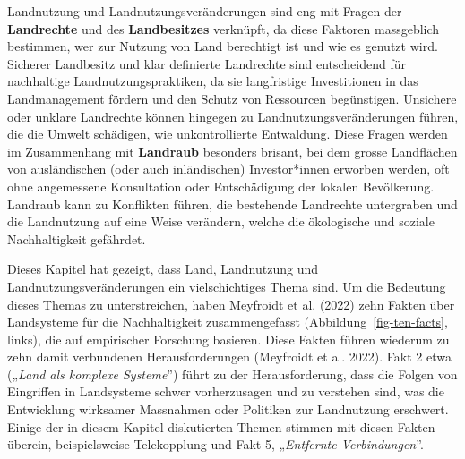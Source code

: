 \documentclass[
  nswissgerman,
  a4paper,
  DIV=11,
  numbers=noendperiod,
  oneside,
  openany]{scrreprt}
\begin{document}
\begin{tcolorbox}[enhanced jigsaw, arc=.35mm, bottomrule=.15mm, bottomtitle=1mm, breakable, colback=white, colbacktitle=quarto-callout-note-color!10!white, colframe=quarto-callout-note-color-frame, coltitle=black, left=2mm, leftrule=.75mm, opacityback=0, opacitybacktitle=0.6, rightrule=.15mm, title={Landrechte und Landbesitz}, titlerule=0mm, toprule=.15mm, toptitle=1mm]

Landnutzung und Landnutzungsveränderungen sind eng mit Fragen der
\textbf{Landrechte} und des \textbf{Landbesitzes} verknüpft, da diese
Faktoren massgeblich bestimmen, wer zur Nutzung von Land berechtigt ist
und wie es genutzt wird. Sicherer Landbesitz und klar definierte
Landrechte sind entscheidend für nachhaltige Landnutzungspraktiken, da
sie langfristige Investitionen in das Landmanagement fördern und den
Schutz von Ressourcen begünstigen. Unsichere oder unklare Landrechte
können hingegen zu Landnutzungsveränderungen führen, die die Umwelt
schädigen, wie unkontrollierte Entwaldung. Diese Fragen werden im
Zusammenhang mit \textbf{Landraub} besonders brisant, bei dem grosse
Landflächen von ausländischen (oder auch inländischen) Investor*innen
erworben werden, oft ohne angemessene Konsultation oder Entschädigung
der lokalen Bevölkerung. Landraub kann zu Konflikten führen, die
bestehende Landrechte untergraben und die Landnutzung auf eine Weise
verändern, welche die ökologische und soziale Nachhaltigkeit gefährdet.

\end{tcolorbox}

Dieses Kapitel hat gezeigt, dass Land, Landnutzung und
Landnutzungsveränderungen ein vielschichtiges Thema sind. Um die
Bedeutung dieses Themas zu unterstreichen, haben {Meyfroidt et al.}
(2022) zehn Fakten über Landsysteme für die Nachhaltigkeit
zusammengefasst (Abbildung~\ref{fig-ten-facts}, links), die auf
empirischer Forschung basieren. Diese Fakten führen wiederum zu zehn
damit verbundenen Herausforderungen ({Meyfroidt et al.} 2022). Fakt 2
etwa („\emph{Land als komplexe Systeme}'') führt zu der Herausforderung,
dass die Folgen von Eingriffen in Landsysteme schwer vorherzusagen und
zu verstehen sind, was die Entwicklung wirksamer Massnahmen oder
Politiken zur Landnutzung erschwert. Einige der in diesem Kapitel
diskutierten Themen stimmen mit diesen Fakten überein, beispielsweise
Telekopplung und Fakt 5, „\emph{Entfernte Verbindungen}''.
\end{document}
